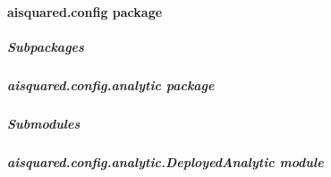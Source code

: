 \documentclass[letterpaper,10pt,english]{sphinxmanual}
\begin{document}
\sphinxstepscope


\paragraph{aisquared.config package}
\label{\detokenize{aisquared.config:aisquared-config-package}}\label{\detokenize{aisquared.config::doc}}

\subparagraph{Subpackages}
\label{\detokenize{aisquared.config:subpackages}}
\sphinxstepscope


\subparagraph{aisquared.config.analytic package}
\label{\detokenize{aisquared.config.analytic:aisquared-config-analytic-package}}\label{\detokenize{aisquared.config.analytic::doc}}

\subparagraph{Submodules}
\label{\detokenize{aisquared.config.analytic:submodules}}

\subparagraph{aisquared.config.analytic.DeployedAnalytic module}
\label{\detokenize{aisquared.config.analytic:module-aisquared.config.analytic.DeployedAnalytic}}\label{\detokenize{aisquared.config.analytic:aisquared-config-analytic-deployedanalytic-module}}
\end{document}
